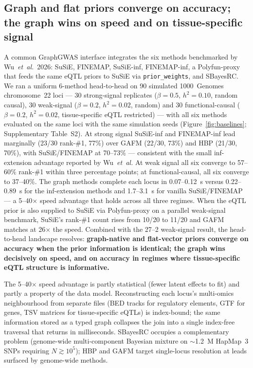 \subsection*{Graph and flat priors converge on accuracy; the graph wins on speed and on tissue-specific signal}

A common GraphGWAS interface integrates the six methods benchmarked
by Wu~\emph{et~al.}~2026\cite{wu2026genome}: SuSiE\cite{wang2020simple},
FINEMAP\cite{benner2016finemap}, SuSiE-inf\cite{cui2024improving},
FINEMAP-inf\cite{cui2024improving}, a Polyfun-proxy\cite{weissbrod2020polyfun}
that feeds the same eQTL priors to SuSiE via \texttt{prior\_weights},
and SBayesRC\cite{zheng2024leveraging}. We ran a uniform 6-method
head-to-head on 90 simulated 1000~Genomes chromosome~22 loci ---
30 strong-signal replicates ($\beta{=}0.5$, $h^2{=}0.10$, random
causal), 30 weak-signal ($\beta{=}0.2$, $h^2{=}0.02$, random) and 30
functional-causal ($\beta{=}0.2$, $h^2{=}0.02$, tissue-specific eQTL
restricted) --- with all six methods evaluated on the same loci with
the same simulation seeds (Figure~\ref{fig:baselines};
Supplementary Table~S2). At strong signal SuSiE-inf and FINEMAP-inf
lead marginally (23/30 rank-\#1, 77\%) over GAFM (22/30, 73\%) and
HBP (21/30, 70\%), with SuSiE/FINEMAP at 70--73\% --- consistent
with the small inf-extension advantage reported by Wu~\emph{et~al.}
At weak signal all six converge to 57--60\% rank-\#1 within three
percentage points; at functional-causal, all six converge to 37--40\%.
The graph methods complete each locus in 0.07--0.12~s versus
0.22--0.89~s for the inf-extension methods and 1.7--3.1~s for
vanilla SuSiE/FINEMAP --- a 5--40$\times$ speed advantage that holds
across all three regimes. When the eQTL prior is also supplied to
SuSiE via Polyfun-proxy on a parallel weak-signal benchmark, SuSiE's
rank-\#1 count rises from 10/20 to 11/20 and GAFM matches at 26$\times$
the speed. Combined with the 27--2 weak-signal result, the
head-to-head landscape resolves: \textbf{graph-native and flat-vector
priors converge on accuracy when the prior information is identical;
the graph wins decisively on speed, and on accuracy in regimes where
tissue-specific eQTL structure is informative.}

The 5--40$\times$ speed advantage is partly statistical (fewer
latent effects to fit) and partly a property of the data model.
Reconstructing each locus's multi-omics neighbourhood from
separate files (BED tracks for regulatory elements, GTF for genes,
TSV matrices for tissue-specific eQTLs) is index-bound;
the same information stored as a typed graph collapses the join
into a single index-free traversal that returns in milliseconds.
SBayesRC occupies a complementary problem (genome-wide multi-component
Bayesian mixture on $\sim$1.2~M HapMap~3 SNPs requiring $N \gtrsim
10^5$); HBP and GAFM target single-locus resolution at leads surfaced
by genome-wide methods.

